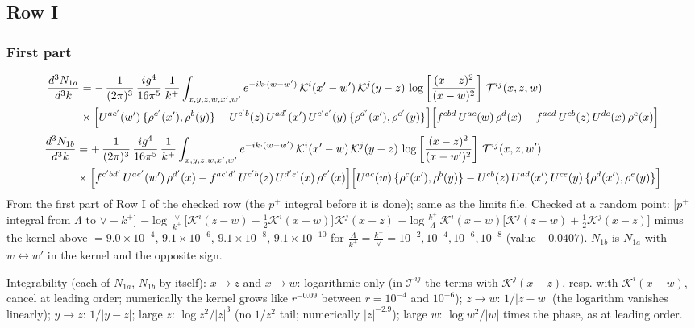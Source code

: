 \documentclass[9pt]{article}
\numberwithin{equation}{section}
\begin{document}
\subsection{Row I}
\subsubsection{First part}
\begin{align}
 \frac{d^{3}N_{1a}}{d^{3}k}  & =  -\,\frac{1}{(2\pi)^{3}}\,\frac{ig^{4}}{16\pi^{5}}\,\frac{1}{k^{+}}\int_{x,y,z,w,x',w^{\prime}} e^{-ik\cdot(w-w^{\prime})}\,\mathcal{K}^{i}(x'-w')\,\mathcal{K}^{j}(y-z)\,\log\left[\frac{(x-z)^{2}}{(x-w)^{2}}\right]\,\mathcal{T}^{ij}(x,z,w)\notag \\
& \times \Big[U^{ac'}(w')\,\{\rho^{c'}(x'),\rho^{b}(y)\}-U^{c'b}(z)\,U^{ad'}(x')\,U^{c'e'}(y)\, \{\rho^{d'}(x'),\rho^{e'}(y)\}\Big]\Big[f^{cbd}\,U^{ac}(w)\,\rho^{d}(x)-f^{acd}\, U^{cb}(z)\,U^{de}(x)\,\rho^{e}(x)\Big]
\end{align}
\begin{align}
\frac{d^{3}N_{1b}}{d^{3}k} & =  +\,\frac{1}{(2\pi)^{3}}\,\frac{ig^{4}}{16\pi^{5}}\,\frac{1}{k^{+}}\int_{x,y,z,w,x',w^{\prime}} e^{-ik\cdot(w-w^{\prime})}\,\mathcal{K}^{i}(x'-w)\,\mathcal{K}^{j}(y-z)\,\log\left[\frac{(x-z)^{2}}{(x-w')^{2}}\right]\,\mathcal{T}^{ij}(x,z,w')\notag \\
& \times \Big[f^{c'bd'}\,U^{ac'}(w')\,\rho^{d'}(x)-f^{ac'd'}\, U^{c'b}(z)\,U^{d'e'}(x)\,\rho^{e'}(x)\Big]\Big[U^{ac}(w)\,\{\rho^{c}(x'),\rho^{b}(y)\}-U^{cb}(z)\,U^{ad}(x')\,U^{ce}(y)\, \{\rho^{d}(x'),\rho^{e}(y)\}\Big]
\end{align}
{\color{gray}\small From the first part of Row I of the checked row (the $p^{+}$ integral before it is done); same as the limits file. Checked at a random point: [$p^{+}$ integral from $\Lambda$ to $\vee-k^{+}$] $-\log\frac{\vee}{k^{+}}\big[\mathcal{K}^{i}(z-w)-\frac12\mathcal{K}^{i}(x-w)\big]\mathcal{K}^{j}(x-z)$ $-\log\frac{k^{+}}{\Lambda}\,\mathcal{K}^{i}(x-w)\big[\mathcal{K}^{j}(z-w)+\frac12\mathcal{K}^{j}(x-z)\big]$ minus the kernel above $=9.0\times10^{-4}$, $9.1\times10^{-6}$, $9.1\times10^{-8}$, $9.1\times10^{-10}$ for $\frac{\Lambda}{k^{+}}=\frac{k^{+}}{\vee}=10^{-2},10^{-4},10^{-6},10^{-8}$ (value $-0.0407$). $N_{1b}$ is $N_{1a}$ with $w\leftrightarrow w'$ in the kernel and the opposite sign.}\par
\noindent Integrability (each of $N_{1a}$, $N_{1b}$ by itself): $x\to z$ and $x\to w$: logarithmic only (in $\mathcal{T}^{ij}$ the terms with $\mathcal{K}^{j}(x-z)$, resp. with $\mathcal{K}^{i}(x-w)$, cancel at leading order; numerically the kernel grows like $r^{-0.09}$ between $r=10^{-4}$ and $10^{-6}$); $z\to w$: $1/|z-w|$ (the logarithm vanishes linearly); $y\to z$: $1/|y-z|$; large $z$: $\log z^{2}/|z|^{3}$ (no $1/z^{2}$ tail; numerically $|z|^{-2.9}$); large $w$: $\log w^{2}/|w|$ times the phase, as at leading order.
\end{document}
